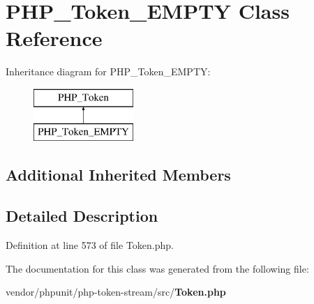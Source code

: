 \section{P\+H\+P\+\_\+\+Token\+\_\+\+E\+M\+P\+T\+Y Class Reference}
\label{class_p_h_p___token___e_m_p_t_y}
Inheritance diagram for P\+H\+P\+\_\+\+Token\+\_\+\+E\+M\+P\+T\+Y\+:\begin{figure}[H]
\begin{center}
\leavevmode
\includegraphics[height=2.000000cm]{class_p_h_p___token___e_m_p_t_y}
\end{center}
\end{figure}
\subsection*{Additional Inherited Members}


\subsection{Detailed Description}


Definition at line 573 of file Token.\+php.



The documentation for this class was generated from the following file\+:\begin{DoxyCompactItemize}
\item 
vendor/phpunit/php-\/token-\/stream/src/{\bf Token.\+php}\end{DoxyCompactItemize}

